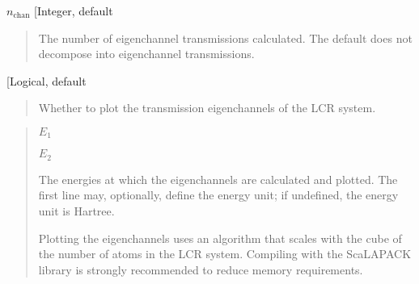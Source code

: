 \documentclass[letterpaper,10pt,english]{sphinxmanual}
\begin{document}
 \(n_{\mathrm{chan}}\) {[}Integer, default \sphinxcode{etrans\_num\_eigchan: 0}{]}
\begin{quote}

\begin{DUlineblock}{0em}
\item[] The number of eigenchannel transmissions calculated. The default does
not decompose into eigenchannel transmissions.
\end{DUlineblock}
\end{quote}

 {[}Logical, default \sphinxcode{etrans\_plot\_eigchan: F}{]}
\begin{quote}

\begin{DUlineblock}{0em}
\item[] Whether to plot the transmission eigenchannels of the LCR system.
\end{DUlineblock}
\end{quote}

\begin{quote}

\begin{DUlineblock}{0em}
\item[] 
\item[]
\begin{DUlineblock}{\DUlineblockindent}
\item[] 
\item[] \(E_1\)
\item[] \(E_2\)
\item[] 
\end{DUlineblock}
\item[] 
\item[] The energies at which the eigenchannels are calculated and plotted. The first line may, optionally, define the energy unit; if undefined, the energy unit is Hartree.
\item[] Plotting the eigenchannels uses an algorithm that scales with the cube of the number of atoms in the LCR system. Compiling with the ScaLAPACK library is strongly recommended to reduce memory requirements.
\end{DUlineblock}
\end{quote}
\end{document}
